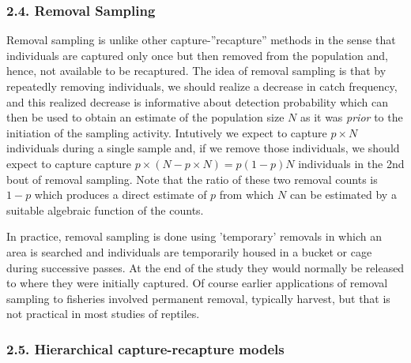 \documentclass{book}
\begin{document}
\subsubsection*{2.4. Removal Sampling}

Removal sampling is unlike other capture-''recapture'' methods in the
sense that individuals are captured only once but then removed from
the population and, hence, not available to be recaptured. The idea of
removal sampling is that by repeatedly removing individuals, we should
realize a decrease in catch frequency, and this realized decrease is
informative about detection probability which can then be used to
obtain an estimate of the population size $N$ as it was {\it prior} to
the initiation of the sampling activity. Intutively we expect to
capture $p \times N$ individuals during a single sample and, if we
remove those individuals, we should expect to capture capture $p
\times (N - p \times N) = p(1-p) N$ individuals in the 2nd bout of
removal sampling. Note that the ratio of these two removal counts is
$1-p$ which produces a direct estimate of $p$ from which $N$ can be
estimated by a suitable algebraic function of the counts.

In practice, removal sampling is done using 'temporary' removals in
which an area is searched and individuals are temporarily housed in a
bucket or cage during successive passes. At the end of the study they
would normally be released to where they were initially captured. Of
course earlier applications of removal sampling to fisheries involved
permanent removal, typically harvest, but that is not practical in
most studies of reptiles.

\subsubsection*{2.5. Hierarchical capture-recapture models}
\end{document}
